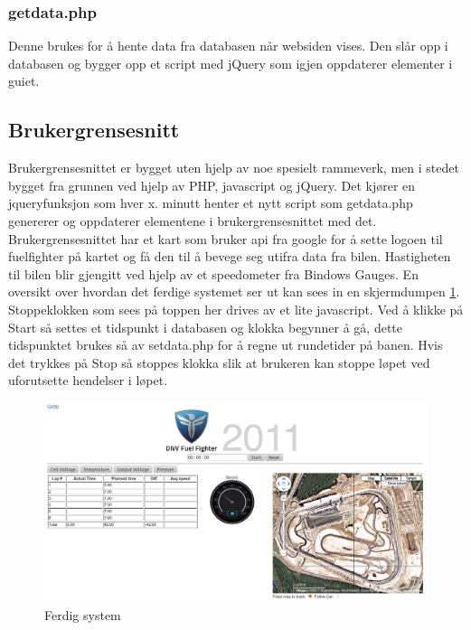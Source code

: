 \subsubsection{getdata.php}
Denne brukes for å hente data fra databasen når websiden vises. Den slår opp i databasen og bygger opp et script med jQuery\cite{jquery} som igjen oppdaterer elementer i guiet.
\subsection{Brukergrensesnitt}
Brukergrensesnittet er bygget uten hjelp av noe spesielt rammeverk, men i stedet bygget fra grunnen ved hjelp av PHP, javascript og jQuery\cite{jquery}. Det kjører en jqueryfunksjon som hver x. minutt henter et nytt script som getdata.php genererer og oppdaterer elementene i brukergrensesnittet med det. Brukergrensesnittet har et kart som bruker api fra google for å sette logoen til fuelfighter på kartet og få den til å bevege seg utifra data fra bilen. Hastigheten til bilen blir gjengitt ved hjelp av et speedometer fra Bindows Gauges\cite{bindows}. En oversikt over hvordan det ferdige systemet ser ut kan sees in en skjermdumpen \ref{gui}. Stoppeklokken som sees på toppen her drives av et lite javascript. Ved å klikke på Start så settes et tidspunkt i databasen og klokka begynner å gå, dette tidspunktet brukes så av setdata.php for å regne ut rundetider på banen. Hvis det trykkes på Stop så stoppes klokka slik at brukeren kan stoppe løpet ved uforutsette hendelser i løpet.
\begin{figure}[H]
\label{gui}
\includegraphics[width=\textwidth]{images/gui.png}
\caption{Ferdig system} 
\end{figure}
